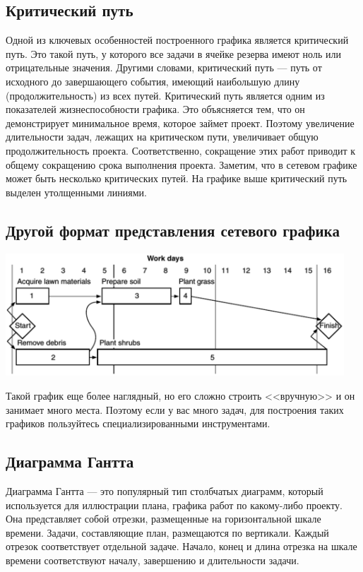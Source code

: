 \documentclass{../../text-style}
\begin{document}
\subsection{Критический путь}

Одной из ключевых особенностей построенного графика является критический путь. Это такой путь, у которого все задачи в ячейке резерва  имеют ноль или отрицательные значения. Другими словами, критический путь --- путь от исходного до завершающего события, имеющий наибольшую длину (продолжительность) из всех путей. Критический путь является одним из показателей жизнеспособности графика. Это объясняется тем, что он демонстрирует минимальное время, которое займет проект. Поэтому увеличение длительности задач, лежащих на критическом пути, увеличивает общую продолжительность проекта. Соответственно, сокращение этих работ приводит к общему сокращению срока выполнения проекта. Заметим, что в сетевом графике может быть несколько критических путей. На графике выше критический путь выделен утолщенными линиями.

\subsection{Другой формат представления сетевого графика}

\begin{center}
    \includegraphics[width=0.95\textwidth]{otherGraphFormat.png}
\end{center}

Такой график еще более наглядный, но его сложно строить <<вручную>> и он занимает много места. Поэтому если у вас много задач, для построения таких графиков пользуйтесь специализированными инструментами.

\subsection{Диаграмма Гантта}

Диаграмма Гантта --- это популярный тип столбчатых диаграмм, который используется для иллюстрации плана, графика работ по какому-либо проекту. Она представляет собой отрезки, размещенные на горизонтальной шкале времени. Задачи, составляющие план, размещаются по вертикали. Каждый отрезок соответствует отдельной задаче. Начало, конец и длина отрезка на шкале времени соответствуют началу, завершению и длительности задачи.
\end{document}
